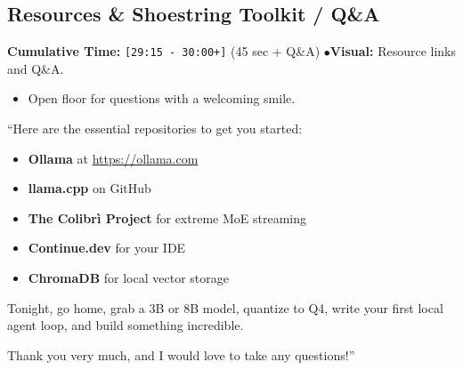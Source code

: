 \documentclass[11pt,a4paper]{article}
\begin{document}
\subsection{Resources \& Shoestring Toolkit / Q\&A}
\begin{directionbox}
    \textbf{Cumulative Time:} \texttt{[29:15 - 30:00+]} (45 sec + Q\&A) \quad$\bullet$\quad \textbf{Visual:} Resource links and Q\&A.
    \begin{itemize}
        \item Open floor for questions with a welcoming smile.
    \end{itemize}
\end{directionbox}

\begin{speechbox}
``Here are the essential repositories to get you started:
\begin{itemize}
    \item \textbf{Ollama} at \url{https://ollama.com}
    \item \textbf{llama.cpp} on GitHub
    \item \textbf{The Colibr\`i Project} for extreme MoE streaming
    \item \textbf{Continue.dev} for your IDE
    \item \textbf{ChromaDB} for local vector storage
\end{itemize}

Tonight, go home, grab a 3B or 8B model, quantize to Q4, write your first local agent loop, and build something incredible.

Thank you very much, and I would love to take any questions!''
\end{speechbox}

\vspace{0.4cm}
\end{document}
